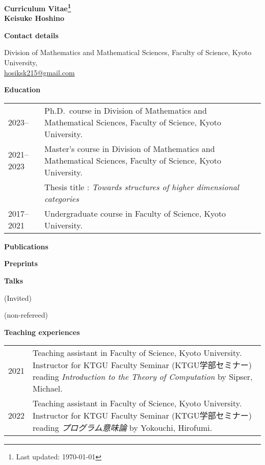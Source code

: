 \documentclass[a4paper,dvipsnames,11pt,backend=luatex]{article} %
\newcommand*{\cvsection}[1]{%
  \vspace{1.2\baselineskip}%
  {\raggedright          %
   \bfseries\large       %
   #1\par}               %
  \vspace{0.4\baselineskip}%
}
\begin{document}
\begin{center}\large\bfseries Curriculum Vitae\footnote{Last updated: \today}
\\
\rm Keisuke Hoshino
\end{center}
\noindent %
\cvsection{Contact details}
\vspace{-1em}%
\noindent %
Division of Mathematics and Mathematical Sciences, Faculty of Science, Kyoto University,
\\
\href{mailto:hosiksk215@gmail.com}{hosiksk215@gmail.com}


\cvsection{Education}
\begin{tabularx}{\textwidth}{@{}lp{140mm}}
  2023--
  &
  Ph.D.\ course in Division of Mathematics and Mathematical Sciences, Faculty of Science, Kyoto University.
  \\
  2021--2023
  &
  Master's course in Division of Mathematics and Mathematical Sciences, Faculty of Science, Kyoto University.
  \\&
  Thesis title : \textit{Towards structures of higher dimensional categories}
  \\
  2017--2021
  &
  Undergraduate course in Faculty of Science, Kyoto University.
\end{tabularx}

\cvsection{Publications}
\begin{refsection}                      %
  \nocite{*} %
  \printbibliography[heading=none,keyword=published,resetnumbers=true]
\end{refsection}

\cvsection{Preprints}
\begin{refsection}
\nocite{*} %
  \printbibliography[heading=none,keyword=preprint,resetnumbers=true]
\end{refsection}

\cvsection{Talks}
(Invited)
\begin{refsection}
\nocite{*} %
  \printbibliography[heading=none,keyword=iv-talk,resetnumbers=true]
\end{refsection}

(non-refereed)
\begin{refsection}
\nocite{*} %
  \printbibliography[heading=none,keyword=nr-talk,resetnumbers=true]
\end{refsection}

\pagebreak

\cvsection{Teaching experiences}
\begin{tabularx}{\textwidth}{@{}lp{140mm}}
  2021
  &
  Teaching assistant in Faculty of Science, Kyoto University.
  Instructor for KTGU Faculty Seminar (KTGU学部セミナー) reading \textit{Introduction to the Theory of Computation} by Sipser, Michael.
  \\
  2022
  &
  Teaching assistant in Faculty of Science, Kyoto University.
  Instructor for KTGU Faculty Seminar (KTGU学部セミナー) reading \textit{プログラム意味論} by Yokouchi, Hirofumi.
\end{tabularx}
\end{document}

